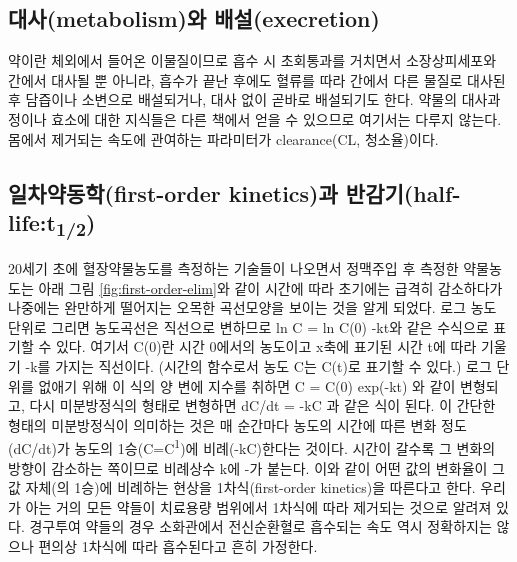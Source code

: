 \documentclass[
  11pt,
  krantz2, a4paper, twoside]{krantz}
\theoremstyle{definition}
\theoremstyle{definition}
\theoremstyle{definition}
\theoremstyle{definition}
\theoremstyle{remark}
\begin{document}
\hypertarget{uxb300uxc0acmetabolismuxc640-uxbc30uxc124execretion}{%
\subsection{대사(metabolism)와 배설(execretion)}\label{uxb300uxc0acmetabolismuxc640-uxbc30uxc124execretion}}

약이란 체외에서 들어온 이물질이므로 흡수 시 초회통과를 거치면서
소장상피세포와 간에서 대사될 뿐 아니라, 흡수가 끝난 후에도 혈류를 따라
간에서 다른 물질로 대사된 후 담즙이나 소변으로 배설되거나, 대사 없이
곧바로 배설되기도 한다. 약물의 대사과정이나 효소에 대한 지식들은 다른
책에서 얻을 수 있으므로 여기서는 다루지 않는다. 몸에서 제거되는 속도에
관여하는 파라미터가 clearance(CL, 청소율)이다.

\hypertarget{uxc77cuxcc28uxc57duxb3d9uxd559first-order-kineticsuxacfc-uxbc18uxac10uxae30half-lifet12}{%
\subsection{\texorpdfstring{일차약동학(first-order kinetics)과 반감기(half-life:t\textsubscript{1/2})}{일차약동학(first-order kinetics)과 반감기(half-life:t1/2)}}\label{uxc77cuxcc28uxc57duxb3d9uxd559first-order-kineticsuxacfc-uxbc18uxac10uxae30half-lifet12}}

20세기 초에 혈장약물농도를 측정하는 기술들이 나오면서 정맥주입 후 측정한
약물농도는 아래 그림 \ref{fig:first-order-elim}와 같이 시간에 따라 초기에는 급격히 감소하다가
나중에는 완만하게 떨어지는 오목한 곡선모양을 보이는 것을 알게 되었다.
로그 농도 단위로 그리면 농도곡선은 직선으로 변하므로 ln C = ln C(0) -kt와 같은 수식으로 표기할 수 있다.
여기서 C(0)란 시간 0에서의 농도이고 x축에 표기된 시간 t에 따라 기울기 -k를 가지는 직선이다. (시간의 함수로서 농도 C는 C(t)로 표기할 수 있다.)
로그 단위를 없애기 위해 이 식의 양 변에 지수를 취하면 C = C(0) exp(-kt) 와 같이 변형되고, 다시 미분방정식의 형태로 변형하면 dC/dt = -kC 과 같은 식이 된다.
이 간단한 형태의 미분방정식이 의미하는 것은 매 순간마다 농도의 시간에 따른 변화 정도(dC/dt)가 농도의 1승(C=C\textsuperscript{1})에 비례(-kC)한다는 것이다.
시간이 갈수록 그 변화의 방향이 감소하는 쪽이므로 비례상수 k에 -가 붙는다.
이와 같이 어떤 값의 변화율이 그 값 자체(의 1승)에 비례하는 현상을 1차식(first-order kinetics)을 따른다고 한다.
우리가 아는 거의 모든 약들이 치료용량 범위에서 1차식에 따라 제거되는 것으로 알려져 있다.
경구투여 약들의 경우 소화관에서 전신순환혈로 흡수되는 속도 역시 정확하지는 않으나 편의상 1차식에 따라 흡수된다고 흔히 가정한다.
\end{document}
